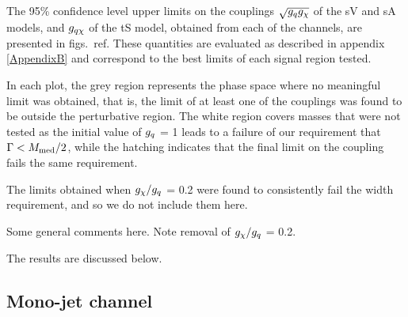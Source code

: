 The 95\% confidence level upper limits on the couplings $\sqrt{g_q g_{\chi}}$ of the sV and sA models, and $g_{q \chi}$ of the tS model, obtained from each of the \monoX channels, are presented in figs.~ref{}. These quantities are evaluated as described in appendix \ref{AppendixB} and correspond to the best limits of each signal region tested.

In each plot, the grey region represents the phase space where no meaningful limit was obtained, that is, the limit of at least one of the couplings was found to be outside the perturbative region. The white region covers masses that were not tested as the initial value of $g_q$ = 1 leads to a failure of our requirement that $\Gamma < M_{\mathrm{med}} / 2$, while the hatching indicates that the final limit on the coupling fails the same requirement.

The limits obtained when $g_{\chi} / g_q$ = 0.2 were found to consistently fail the width requirement, and so we do not include them here.

Some general comments here. Note removal of $g_{\chi} / g_q$ = 0.2.

The results are discussed below.

\subsection{Mono-jet channel}

